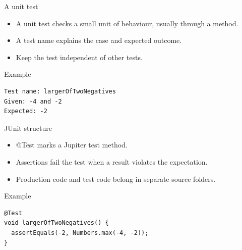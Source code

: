 \documentclass[10pt,aspectratio=169]{beamer}
\begin{document}
\begin{frame}[fragile,t]{A unit test}
\begin{itemize}
\item A unit test checks a small unit of behaviour, usually through a method.
\item A test name explains the case and expected outcome.
\item Keep the test independent of other tests.
\end{itemize}
\vspace{1mm}\begin{block}{Example}
\begin{lstlisting}
Test name: largerOfTwoNegatives
Given: -4 and -2
Expected: -2
\end{lstlisting}
\end{block}
\end{frame}

\begin{frame}[fragile,t]{JUnit structure}
\begin{itemize}
\item @Test marks a Jupiter test method.
\item Assertions fail the test when a result violates the expectation.
\item Production code and test code belong in separate source folders.
\end{itemize}
\vspace{1mm}\begin{block}{Example}
\begin{lstlisting}
@Test
void largerOfTwoNegatives() {
  assertEquals(-2, Numbers.max(-4, -2));
}
\end{lstlisting}
\end{block}
\end{frame}
\end{document}
